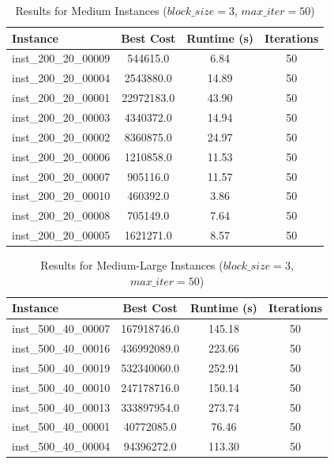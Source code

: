 \documentclass{article}
\begin{document}
\begin{table}[H]
\centering
\caption{Results for Medium Instances ($block\_size=3$, $max\_iter=50$)}
\begin{tabular}{lccc}
\toprule
\textbf{Instance} & \textbf{Best Cost} & \textbf{Runtime (s)} & \textbf{Iterations} \\
\midrule
inst\_200\_20\_00009 & 544615.0  & 6.84  & 50 \\
inst\_200\_20\_00004 & 2543880.0 & 14.89 & 50 \\
inst\_200\_20\_00001 & 22972183.0 & 43.90 & 50 \\
inst\_200\_20\_00003 & 4340372.0 & 14.94 & 50 \\
inst\_200\_20\_00002 & 8360875.0 & 24.97 & 50 \\
inst\_200\_20\_00006 & 1210858.0 & 11.53 & 50 \\
inst\_200\_20\_00007 & 905116.0  & 11.57 & 50 \\
inst\_200\_20\_00010 & 460392.0  & 3.86  & 50 \\
inst\_200\_20\_00008 & 705149.0  & 7.64  & 50 \\
inst\_200\_20\_00005 & 1621271.0 & 8.57  & 50 \\
\bottomrule
\end{tabular}
\label{tab:results_200_20}
\end{table}

\begin{table}[H]
\centering
\caption{Results for Medium-Large Instances ($block\_size=3$, $max\_iter=50$)}
\begin{tabular}{lccc}
\toprule
\textbf{Instance} & \textbf{Best Cost} & \textbf{Runtime (s)} & \textbf{Iterations} \\
\midrule
inst\_500\_40\_00007 & 167918746.0 & 145.18 & 50 \\
inst\_500\_40\_00016 & 436992089.0 & 223.66 & 50 \\
inst\_500\_40\_00019 & 532340060.0 & 252.91 & 50 \\
inst\_500\_40\_00010 & 247178716.0 & 150.14 & 50 \\
inst\_500\_40\_00013 & 333897954.0 & 273.74 & 50 \\
inst\_500\_40\_00001 & 40772085.0  & 76.46  & 50 \\
inst\_500\_40\_00004 & 94396272.0  & 113.30 & 50 \\
\bottomrule
\end{tabular}
\label{tab:results_500_40}
\end{table}
\end{document}
